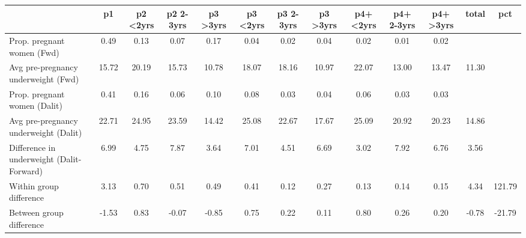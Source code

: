 \begin{tabular}{l*{12}{c}}
\toprule
            &\multicolumn{1}{c}{p1}&\multicolumn{1}{c}{p2 <2yrs}&\multicolumn{1}{c}{p2 2-3yrs}&\multicolumn{1}{c}{p3 >3yrs}&\multicolumn{1}{c}{p3 <2yrs}&\multicolumn{1}{c}{p3 2-3yrs}&\multicolumn{1}{c}{p3 >3yrs}&\multicolumn{1}{c}{p4+ <2yrs}&\multicolumn{1}{c}{p4+ 2-3yrs}&\multicolumn{1}{c}{p4+ >3yrs}&\multicolumn{1}{c}{total}&\multicolumn{1}{c}{pct}\\
\midrule
\midrule
Prop. pregnant women (Fwd)&        0.49&        0.13&        0.07&        0.17&        0.04&        0.02&        0.04&        0.02&        0.01&        0.02&            &            \\
Avg pre-pregnancy underweight (Fwd)&       15.72&       20.19&       15.73&       10.78&       18.07&       18.16&       10.97&       22.07&       13.00&       13.47&       11.30&            \\
Prop. pregnant women (Dalit)&        0.41&        0.16&        0.06&        0.10&        0.08&        0.03&        0.04&        0.06&        0.03&        0.03&            &            \\
Avg pre-pregnancy underweight (Dalit)&       22.71&       24.95&       23.59&       14.42&       25.08&       22.67&       17.67&       25.09&       20.92&       20.23&       14.86&            \\
Difference in underweight (Dalit-Forward)&        6.99&        4.75&        7.87&        3.64&        7.01&        4.51&        6.69&        3.02&        7.92&        6.76&        3.56&            \\
Within group difference&        3.13&        0.70&        0.51&        0.49&        0.41&        0.12&        0.27&        0.13&        0.14&        0.15&        4.34&      121.79\\
Between group difference&       -1.53&        0.83&       -0.07&       -0.85&        0.75&        0.22&        0.11&        0.80&        0.26&        0.20&       -0.78&      -21.79\\
\bottomrule
\end{tabular}
